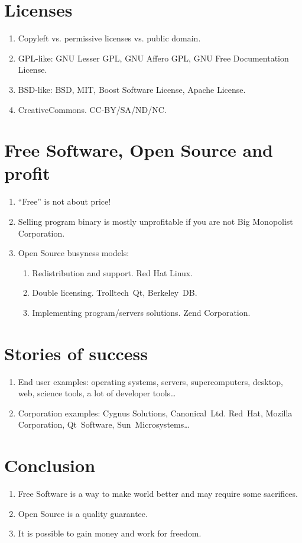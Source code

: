 \documentclass[10pt,a4paper]{proc}
\newcommand{\bee}{\begin{enumerate}\setlength{\itemsep}{-0.7mm}}
\newcommand{\ene}{\end{enumerate}}
\begin{document}
\section{Licenses}
\bee
  \item Copyleft vs. permissive licenses vs. public domain.
  \item GPL-like: GNU Lesser GPL, GNU Affero GPL, GNU Free Documentation License.
  \item BSD-like: BSD, MIT, Boost Software License, Apache License.
  \item CreativeCommons. CC-BY/SA/ND/NC.
\ene

\section{Free Software, Open Source and profit}
\bee
  \item ``Free'' is not about price!
  \item Selling program binary is mostly unprofitable if you are not Big Monopolist Corporation.
  \item Open Source busyness models:
  \bee
    \item Redistribution and support. Red Hat Linux.
    \item Double licensing. Trolltech~Qt, Berkeley~DB.
    \item Implementing program/servers solutions. Zend Corporation.
  \ene
\ene

\section{Stories of success}
\bee
  \item End user examples: operating systems, servers, supercomputers, desktop, web, science tools, 
a lot of developer tools\dots
  \item Corporation examples: Cygnus Solutions, Canonical~Ltd. Red~Hat, Mozilla Corporation, Qt~Software, 
Sun~Microsystems\dots
\ene

\section{Conclusion}
\bee
  \item Free Software is a way to make world better and may require some 
sacrifices.
  \item Open Source is a quality guarantee.
  \item It is possible to gain money and work for freedom.
\ene
\end{document}
